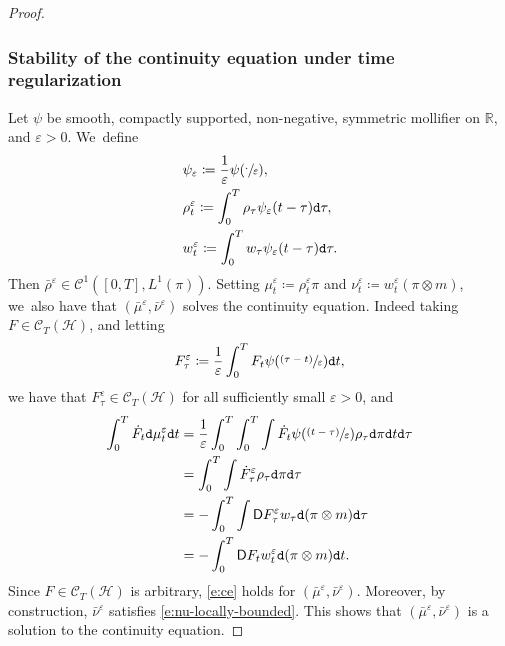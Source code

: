 \documentclass[10pt]{amsart}
\newcommand{\psfrac}[2]{\sfrac{(#1)}{#2}}
\theoremstyle{definition}
\theoremstyle{remark}
\DeclarePairedDelimiter{\paren}{\lparen}{\rparen}
\begin{document}
\begin{proof}
\subsubsection*{Stability of the continuity equation under time regularization}
Let $\psi$ be smooth, compactly supported, non-negative, symmetric mollifier on $\mathbb{R}$, and $\varepsilon > 0$. We~define
\begin{align*}
& \psi_{\varepsilon} \coloneq \frac{1}{\varepsilon} \psi\paren*{\sfrac{\cdot}{\varepsilon}}, \\
& \rho^{\varepsilon}_{t} \coloneq \int_{0}^{T} \rho_{\tau} \psi_{\varepsilon}(t-\tau) \mathtt{d} \tau, \\
& w^{\varepsilon}_{t} \coloneq \int_{0}^{T} w_{\tau} \psi_{\varepsilon}(t-\tau) \mathtt{d} \tau.
\end{align*}
Then $\bar{\rho}^{\varepsilon} \in \mathscr{C}^{1}([0,T], L^{1}(\pi))$.
Setting $\mu^{\varepsilon}_{t} \coloneq \rho^{\varepsilon}_{t} \pi$ and $\nu^{\varepsilon}_{t} \coloneq w^{\varepsilon}_{t} (\pi \otimes m)$, we~also have that $(\bar{\mu}^{\varepsilon}, \bar{\nu}^{\varepsilon})$ solves the continuity equation.
Indeed taking $F \in \mathscr{C}_{T}(\mathscr{H})$, and letting
\begin{equation*}
F_{\tau}^{\varepsilon} \coloneq \frac{1}{\varepsilon} \int_{0}^{T} F_{t} \psi\paren*{\psfrac{\tau - t}{\varepsilon}} \mathtt{d} t,
\end{equation*}
we have that $F^{\varepsilon}_{\tau} \in \mathscr{C}_{T}(\mathscr{H})$ for all sufficiently small $\varepsilon > 0$, and
\begin{align*}
\int_{0}^{T} \dot{F}_{t} \mathtt{d} \mu^{\varepsilon}_{t} \mathtt{d} t &= \frac{1}{\varepsilon} \int_{0}^{T} \int_{0}^{T} \int \dot{F}_{t} \psi\paren*{\psfrac{t-\tau}{\varepsilon}} \rho_{\tau} \mathtt{d} \pi \mathtt{d} t \mathtt{d} \tau \\
&= \int_{0}^{T} \int \dot{F}_{\tau}^{\varepsilon} \rho_{\tau} \mathtt{d} \pi \mathtt{d} \tau \\
&= - \int_{0}^{T} \int \mathsf{D} F^{\varepsilon}_{\tau} w_{\tau} \mathtt{d}(\pi \otimes m) \mathtt{d} \tau \\
&= - \int_{0}^{T} \mathsf{D} F_{t} w^{\varepsilon}_{t} \mathtt{d}(\pi \otimes m) \mathtt{d} t.
\end{align*}
Since $F \in \mathscr{C}_{T}(\mathscr{H})$ is arbitrary, \cref{e:ce} holds for $(\bar{\mu}^{\varepsilon}, \bar{\nu}^{\varepsilon})$.
Moreover, by construction, $\bar{\nu}^{\varepsilon}$ satisfies \cref{e:nu-locally-bounded}.
This shows that $(\bar{\mu}^{\varepsilon}, \bar{\nu}^{\varepsilon})$ is a solution to the continuity equation.


\end{proof}
\end{document}
